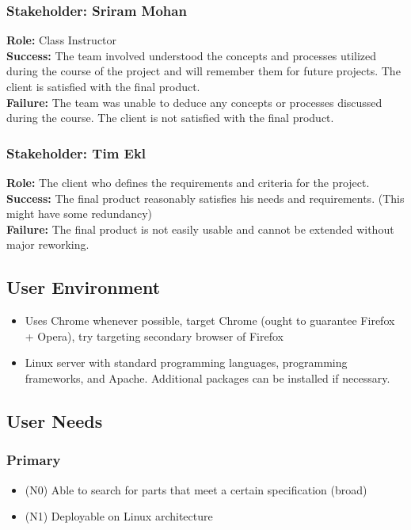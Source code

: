 \documentclass{article}
\begin{document}
\subsubsection{Stakeholder: Sriram Mohan}
\textbf{Role:} Class Instructor\\
\textbf{Success:} The team involved understood the concepts and processes utilized during the course of the project and will remember them for future projects. The client is satisfied with the final product.\\
\textbf{Failure:} The team was unable to deduce any concepts or processes discussed during the course. The client is not satisfied with the final product.

\subsubsection{Stakeholder: Tim Ekl}
\textbf{Role:} The client who defines the requirements and criteria for the project.\\
\textbf{Success:} The final product reasonably satisfies his needs and requirements. (This might have some redundancy)\\
\textbf{Failure:} The final product is not easily usable and cannot be extended without major reworking.

\subsection{User Environment}
\begin{itemize}
\item Uses Chrome whenever possible, target Chrome (ought to guarantee Firefox + Opera), try targeting secondary browser of Firefox
\item Linux server with standard programming languages, programming frameworks, and Apache.  Additional packages can be installed if necessary.
\end{itemize}

\subsection{User Needs}
\subsubsection{Primary}
\begin{itemize}
\item (N0) Able to search for parts that meet a certain specification (broad)
\item (N1) Deployable on Linux architecture
\end{itemize}
\end{document}
